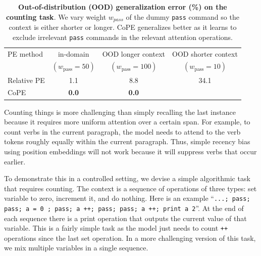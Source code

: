 \documentclass{article}
\newcommand{\ours}{CoPE\xspace}
\newcommand{\std}[1]{\small (#1)}
\begin{document}
\fi 
\begin{table}[t]
  \caption{{\bf Out-of-distribution (OOD) generalization error (\%) on the counting task}. We vary weight $w_{pass}$ of the dummy \texttt{pass} command so the  context is either shorter or longer. \ours{} generalizes better as it  learns to exclude irrelevant \texttt{pass} commands in the relevant attention operations.}
  \vspace{2mm}
  \label{tab:count_general}
  \centering
  \begin{tabular}{lccc}
    \toprule
        PE method   &  in-domain & OOD longer context & OOD shorter context \\
        & $(w_\text{pass}=50)$ & $(w_\text{pass}=100)$ & $(w_\text{pass}=10)$ \\
    \midrule
    Relative PE & 1.1 & 8.8  & 34.1\\
    \ours & {\bf 0.0}  & {\bf 0.0}  & \phantom{0}{\bf 4.0} \\
    \bottomrule
  \end{tabular}
\end{table}


Counting things is more challenging than simply recalling the last instance because it requires more uniform attention over a certain span.
For example, to count verbs in the current paragraph, the model needs to attend to the verb tokens roughly equally within the current paragraph. 
Thus, simple recency bias using position embeddings will not work because it will suppress verbs that  occur earlier.

To demonstrate this in a controlled setting, we devise a simple algorithmic task that requires counting. 
The context is a sequence of operations of three types: set variable to zero, increment it, and do nothing.
Here is an example ``\texttt{...; pass; pass; a = 0 ; pass; a ++; pass; pass; a ++; print a 2}''.
At the end of each sequence there is a print operation that outputs the current value of that variable.
This is a fairly simple task as the model just needs to count \texttt{++} operations since the last set operation. In a more challenging version of this task, we mix multiple variables in a single sequence.
\end{document}
